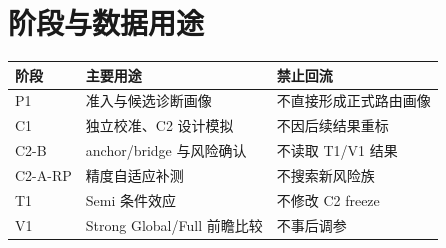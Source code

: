 \section{阶段与数据用途}

\begin{table}[ht]
\centering
\begin{tabular}{lll}
\toprule
阶段 & 主要用途 & 禁止回流 \\
\midrule
P1 & 准入与候选诊断画像 & 不直接形成正式路由画像 \\
C1 & 独立校准、C2 设计模拟 & 不因后续结果重标 \\
C2-B & anchor/bridge 与风险确认 & 不读取 T1/V1 结果 \\
C2-A-RP & 精度自适应补测 & 不搜索新风险族 \\
T1 & Semi 条件效应 & 不修改 C2 freeze \\
V1 & Strong Global/Full 前瞻比较 & 不事后调参 \\
\bottomrule
\end{tabular}
\end{table}

